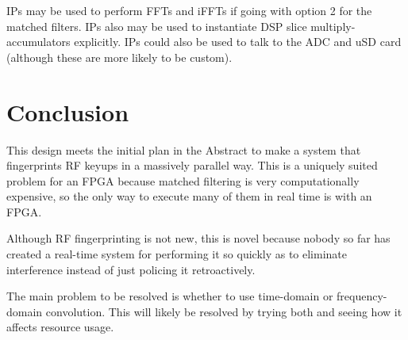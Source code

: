 \documentclass{article}
\begin{document}
IPs may be used to perform FFTs and iFFTs if going with option 2 for the matched filters. IPs also may be used to instantiate DSP slice multiply-accumulators explicitly. IPs could also be used to talk to the ADC and uSD card (although these are more likely to be custom).

\section{Conclusion}

This design meets the initial plan in the Abstract to make a system that fingerprints RF keyups in a massively parallel way. This is a uniquely suited problem for an FPGA because matched filtering is very computationally expensive, so the only way to execute many of them in real time is with an FPGA.

Although RF fingerprinting is not new, this is novel because nobody so far has created a real-time system for performing it so quickly as to eliminate interference instead of just policing it retroactively.

The main problem to be resolved is whether to use time-domain or frequency-domain convolution. This will likely be resolved by trying both and seeing how it affects resource usage.
\end{document}
